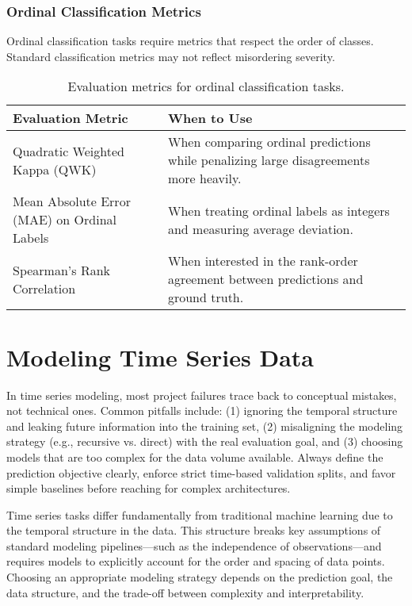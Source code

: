\documentclass[12pt,openany]{book}
\begin{document}
\subsection{Ordinal Classification Metrics}

Ordinal classification tasks require metrics that respect the 
order of classes. Standard classification metrics may not reflect 
misordering severity.

\begin{table}[H]
    \centering
    \small
    \renewcommand{\arraystretch}{1.3}
    \begin{tabular}{|l|p{9cm}|}
        \hline
        \textbf{Evaluation Metric} & \textbf{When to Use} \\
        \hline
        Quadratic Weighted Kappa (QWK) & When comparing ordinal predictions while penalizing large disagreements more heavily. \\
        \hline
        Mean Absolute Error (MAE) on Ordinal Labels & When treating ordinal labels as integers and measuring average deviation. \\
        \hline
        Spearman's Rank Correlation & When interested in the rank-order agreement between predictions and ground truth. \\
        \hline
    \end{tabular}
    \caption{Evaluation metrics for ordinal classification tasks.}
\end{table}




\chapter{Modeling Time Series Data}

\begin{summarybox}
In time series modeling, most project failures trace back to conceptual mistakes, not technical ones. Common pitfalls include: (1) ignoring the temporal structure and leaking future information into the training set, (2) misaligning the modeling strategy (e.g., recursive vs. direct) with the real evaluation goal, and (3) choosing models that are too complex for the data volume available. Always define the prediction objective clearly, enforce strict time-based validation splits, and favor simple baselines before reaching for complex architectures.
\end{summarybox}

Time series tasks differ fundamentally from traditional machine learning due to the temporal structure in the data. This structure breaks key assumptions of standard modeling pipelines—such as the independence of observations—and requires models to explicitly account for the order and spacing of data points. Choosing an appropriate modeling strategy depends on the prediction goal, the data structure, and the trade-off between complexity and interpretability.
\end{document}
